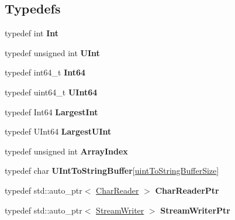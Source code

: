 \subsection*{Typedefs}
\begin{DoxyCompactItemize}
\item 
\mbox{\label{namespaceJson_a08122e8005b706d982e48cca1e2119c7}} 
typedef int {\bfseries Int}
\item 
\mbox{\label{namespaceJson_a800fb90eb6ee8d5d62b600c06f87f7d4}} 
typedef unsigned int {\bfseries U\+Int}
\item 
\mbox{\label{namespaceJson_ac62566f36fd33115957b91305c9ed1dc}} 
typedef int64\+\_\+t {\bfseries Int64}
\item 
\mbox{\label{namespaceJson_adf3fa5cb60c619e4f02315ad355e0ca1}} 
typedef uint64\+\_\+t {\bfseries U\+Int64}
\item 
\mbox{\label{namespaceJson_a218d880af853ce786cd985e82571d297}} 
typedef Int64 {\bfseries Largest\+Int}
\item 
\mbox{\label{namespaceJson_ae202ecad69725e23443f465e257456d0}} 
typedef U\+Int64 {\bfseries Largest\+U\+Int}
\item 
\mbox{\label{namespaceJson_a8048e741f2177c3b5d9ede4a5b8c53c2}} 
typedef unsigned int {\bfseries Array\+Index}
\item 
\mbox{\label{namespaceJson_a602bcf69c2042fb61c3b243cb16f04ca}} 
typedef char {\bfseries U\+Int\+To\+String\+Buffer}\mbox{[}\hyperlink{namespaceJson_a2aacab54ef6fc18e833fbd4982a0a23aae4f2008c7919f20d81286121d1374424}{uint\+To\+String\+Buffer\+Size}\mbox{]}
\item 
\mbox{\label{namespaceJson_a4724efb8d41614b47036cb8b54233837}} 
typedef std\+::auto\+\_\+ptr$<$ \hyperlink{classJson_1_1CharReader}{Char\+Reader} $>$ {\bfseries Char\+Reader\+Ptr}
\item 
\mbox{\label{namespaceJson_a7132404aeebfc96d7c6ad2c66260afb5}} 
typedef std\+::auto\+\_\+ptr$<$ \hyperlink{classJson_1_1StreamWriter}{Stream\+Writer} $>$ {\bfseries Stream\+Writer\+Ptr}
\end{DoxyCompactItemize}
